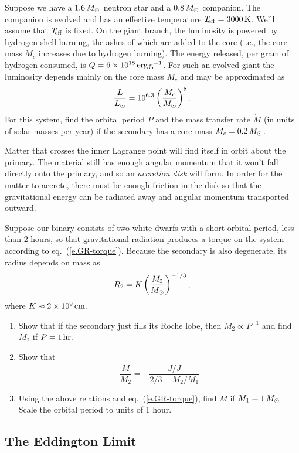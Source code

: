 \begin{exercisebox}
Suppose we have a $1.6\,M_\odot$ neutron star and a $0.8\,M_\odot$ companion.  The companion is evolved and has an effective temperature $T_{\!\mathrm{eff}} = 3000\,\mathrm{K}$.  We'll assume that $T_{\!\mathrm{eff}}$ is fixed.  On the giant branch, the luminosity is powered by hydrogen shell burning, the ashes of which are added to the core (i.e., the core mass $M_{c}$ increases due to hydrogen burning).  The energy released, per gram of hydrogen consumed, is $Q = 6\times 10^{18}\,\mathrm{erg}\,\mathrm{g}^{-1}$. For such an evolved giant the luminosity depends mainly on the core mass $M_{c}$ and may be approximated as%
\[
	\frac{L}{L_{\odot}} = 10^{6.3}\left(\frac{M_{c}}{M_\odot}\right)^{8}.
\]
For this system, find the orbital period $P$ and the mass transfer rate $\dot{M}$ (in units of solar masses per year) if the secondary has a core mass $M_{c} = 0.2\,M_\odot$. 
\end{exercisebox}


Matter that crosses the inner Lagrange point will find itself in orbit about the primary.  The material still has enough angular momentum that it won't fall directly onto the primary, and so an \emph{accretion disk} will form. In order for the matter to accrete, there must be enough friction in the disk so that the gravitational energy can be radiated away and angular momentum transported outward.

\newpage
\begin{exercisebox} Suppose our binary consists of two white dwarfs with a short orbital period, less than 2 hours, so that gravitational radiation produces a torque on the system according to eq.~(\ref{e.GR-torque}).  Because the secondary is also degenerate, its radius depends on mass as
\[ R_{2} = K \left(\frac{M_{2}}{M_\odot}\right)^{-1/3}, \]
where $K \approx 2\times 10^{9}\,\mathrm{c}\mathrm{m}$.
\begin{enumerate}
\item Show that if the secondary just fills its Roche lobe, then $M_{2} \propto P^{-1}$ and find $M_{2}$ if $P = 1\,\mathrm{hr}$.
\item Show that
\[ \frac{\dot{M}}{M_{2}} = - \frac{\dot{J}/J}{2/3 - M_{2}/M_{1}} \]
\item Using the above relations and eq.~(\ref{e.GR-torque}), find $\dot{M}$ if $M_{1} = 1\,M_\odot$. Scale the orbital period to units of 1 hour.
\end{enumerate}
\end{exercisebox}

\subsection{The Eddington Limit}

